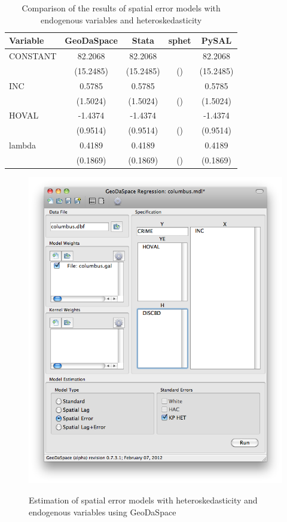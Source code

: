 \documentclass{article}
\begin{document}
\begin{table}[htpb]
\caption{Comparison of the results of spatial error models with endogenous variables and heteroskedasticity}
\label{t:res_het_endog}
\centering
\begin{small}
\begin{tabular}{l|cccc} \hline
\textbf{Variable}&\textbf{GeoDaSpace}&\textbf{Stata}&\textbf{sphet}&\textbf{PySAL}\\ \hline
CONSTANT&82.2068&82.2068&&82.2068\\
&(15.2485)&(15.2485)&()&(15.2485)\\
INC&0.5785&0.5785&&0.5785\\
&(1.5024)&(1.5024)&()&(1.5024)\\
HOVAL&-1.4374&-1.4374&&-1.4374\\
&(0.9514)&(0.9514)&()&(0.9514)\\
lambda&0.4189&0.4189&&0.4189\\
&(0.1869)&(0.1869)&()&(0.1869)\\
\hline
\end{tabular}
\end{small}
\end{table}


\begin{figure}[htb]
\caption{Estimation of spatial error models with heteroskedasticity and endogenous variables using GeoDaSpace}
\label{f:GS_het_endog}
\begin{center}
\includegraphics[width=0.7\linewidth]{GS_het_endog.png}\\
\end{center}
\end{figure}
\end{document}
